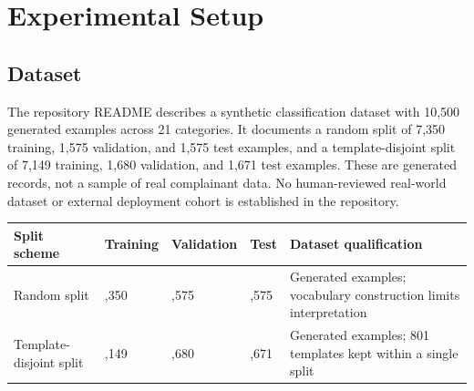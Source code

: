 \documentclass[12pt,a4paper,oneside]{report}
\begin{document}
\section{Experimental Setup}
\subsection{Dataset}
The repository README describes a synthetic classification dataset with 10,500 generated examples across 21 categories. It documents a random split of 7,350 training, 1,575 validation, and 1,575 test examples, and a template-disjoint split of 7,149 training, 1,680 validation, and 1,671 test examples. These are generated records, not a sample of real complainant data. No human-reviewed real-world dataset or external deployment cohort is established in the repository.\par\medskip
{}
\begin{longtable}{|>{\RaggedRight\arraybackslash}p{}|>{\RaggedRight\arraybackslash}p{}|>{\RaggedRight\arraybackslash}p{}|>{\RaggedRight\arraybackslash}p{}|>{\RaggedRight\arraybackslash}p{}|}
\hline
\textbf{Split scheme} & \textbf{Training} & \textbf{Validation} & \textbf{Test} & \textbf{Dataset qualification} \\\hline
Random split & 7,350 & 1,575 & 1,575 & Generated examples; vocabulary construction limits interpretation \\\hline
Template-disjoint split & 7,149 & 1,680 & 1,671 & Generated examples; 801 templates kept within a single split \\\hline
\end{longtable}
\vspace{2mm}
\end{document}

